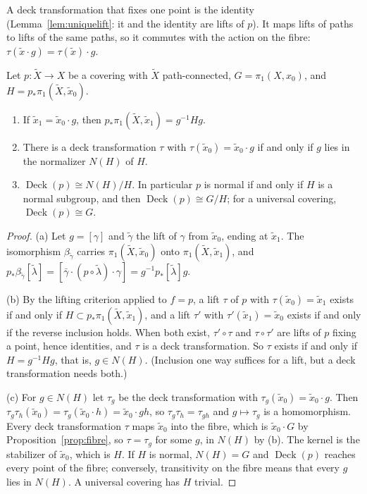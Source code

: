 A deck transformation that fixes one point is the identity (Lemma~\ref{lem:uniquelift}: it and the identity are lifts of $p$). It maps lifts of paths to lifts of the same paths, so it
commutes with the action on the fibre: $\tau(\tilde x\cdot g)=\tau(\tilde x)\cdot g$.

\begin{theorem}\label{thm:deck}
Let $p\colon\tilde X\to X$ be a covering with $\tilde X$ path-connected, $G=\pi_1(X,x_0)$, and $H=p_*\pi_1(\tilde X,\tilde x_0)$.
\begin{enumerate}
\item[(a)] If $\tilde x_1=\tilde x_0\cdot g$, then $p_*\pi_1(\tilde X,\tilde x_1)=g^{-1}Hg$.
\item[(b)] There is a deck transformation $\tau$ with $\tau(\tilde x_0)=\tilde x_0\cdot g$ if and only if $g$ lies in the normalizer $N(H)$ of $H$.
\item[(c)] $\operatorname{Deck}(p)\cong N(H)/H$. In particular $p$ is normal if and only if $H$ is a normal subgroup, and then $\operatorname{Deck}(p)\cong G/H$; for a universal covering,
$\operatorname{Deck}(p)\cong G$.
\end{enumerate}
\end{theorem}

\begin{proof}
(a) Let $g=[\gamma]$ and $\tilde\gamma$ the lift of $\gamma$ from $\tilde x_0$, ending at $\tilde x_1$. The isomorphism $\beta_{\tilde\gamma}$ carries $\pi_1(\tilde X,\tilde x_0)$ onto $\pi_1(\tilde X,\tilde x_1)$, and
$p_*\beta_{\tilde\gamma}[\tilde\lambda]=[\bar\gamma\cdot(p\circ\tilde\lambda)\cdot\gamma]=g^{-1}p_*[\tilde\lambda]g$.

(b) By the lifting criterion applied to $f=p$, a lift $\tau$ of $p$ with $\tau(\tilde x_0)=\tilde x_1$ exists if and only if $H\subset p_*\pi_1(\tilde X,\tilde x_1)$, and a lift $\tau'$ with $\tau'(\tilde x_1)=\tilde x_0$ exists
if and only if the reverse inclusion holds. When both exist, $\tau'\circ\tau$ and $\tau\circ\tau'$ are lifts of $p$ fixing a point, hence identities, and $\tau$ is a deck transformation. So $\tau$ exists if and
only if $H=g^{-1}Hg$, that is, $g\in N(H)$. (Inclusion one way suffices for a lift, but a deck transformation needs both.)

(c) For $g\in N(H)$ let $\tau_g$ be the deck transformation with $\tau_g(\tilde x_0)=\tilde x_0\cdot g$. Then $\tau_g\tau_h(\tilde x_0)=\tau_g(\tilde x_0\cdot h)=\tilde x_0\cdot gh$, so $\tau_g\tau_h=\tau_{gh}$ and $g\mapsto\tau_g$ is a
homomorphism. Every deck transformation $\tau$ maps $\tilde x_0$ into the fibre, which is $\tilde x_0\cdot G$ by Proposition~\ref{prop:fibre}, so $\tau=\tau_g$ for some $g$, in $N(H)$ by (b). The kernel is the
stabilizer of $\tilde x_0$, which is $H$. If $H$ is normal, $N(H)=G$ and $\operatorname{Deck}(p)$ reaches every point of the fibre; conversely, transitivity on the fibre means that every $g$
lies in $N(H)$. A universal covering has $H$ trivial.
\end{proof}

